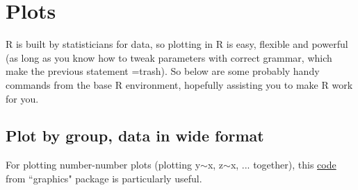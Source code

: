 \documentclass[../note.tex]{subfiles} %
\begin{document}
\section{Plots}
R is built by statisticians for data, so plotting in R is easy, flexible and powerful (as long as you know how to tweak parameters with correct grammar, which make the previous statement =trash).  So below are some probably handy commands from the base R environment, hopefully assisting you to make R work for you.

\subsection{Plot by group, data in wide format}
For plotting number-number plots (plotting y$\sim$x, z$\sim$x, ... together), this \href{http://www.datasciencemadesimple.com/matplot-in-r/}{code} from ``graphics" package\autocite{Rcore} is particularly useful.
\end{document}

